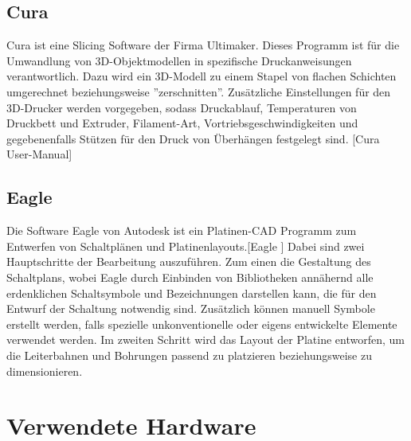 \documentclass[11pt, titlepage]{report}
\begin{document}
			\subsection*{Cura}
			\label{sec:Cura}
				Cura ist eine Slicing Software der Firma Ultimaker. Dieses Programm ist für die Umwandlung von 3D-Objektmodellen in spezifische Druckanweisungen verantwortlich. Dazu wird ein 3D-Modell zu einem Stapel von flachen Schichten umgerechnet beziehungsweise ''zerschnitten''. Zusätzliche Einstellungen für den 3D-Drucker werden vorgegeben, sodass Druckablauf, Temperaturen von Druckbett und Extruder, Filament-Art, 
				Vortriebsgeschwindigkeiten und gegebenenfalls Stützen für den Druck von Überhängen festgelegt sind. [Cura User-Manual\cite[S.26-29]{Cura}]
			\subsection*{Eagle}
			\label{sec:Eagle}
				Die Software Eagle von Autodesk ist ein Platinen-CAD Programm zum Entwerfen von Schaltplänen und Platinenlayouts.[Eagle \cite{Eagle}] Dabei sind zwei Hauptschritte der Bearbeitung auszuführen. Zum einen die Gestaltung des Schaltplans, wobei Eagle durch Einbinden von Bibliotheken annähernd alle erdenklichen Schaltsymbole und Bezeichnungen darstellen kann, die für den Entwurf der Schaltung notwendig sind. Zusätzlich können manuell Symbole erstellt werden, falls spezielle unkonventionelle oder eigens entwickelte Elemente verwendet werden.
				Im zweiten Schritt wird das Layout der Platine entworfen, um die Leiterbahnen und Bohrungen passend zu platzieren beziehungsweise zu dimensionieren.
		\section{Verwendete Hardware}
\end{document}
